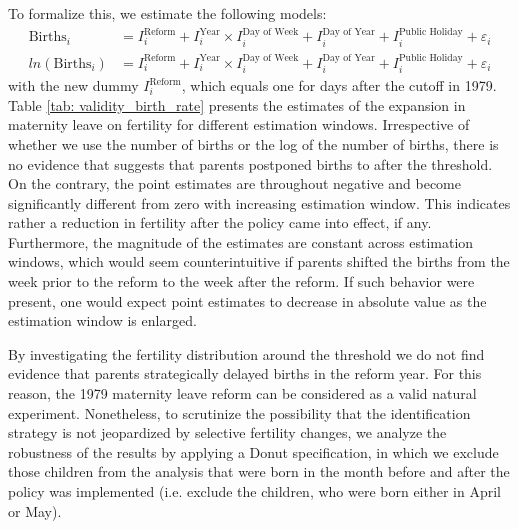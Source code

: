 \documentclass[11pt, a4paper]{article} %
\begin{document}
To formalize this, we estimate the following models: 
\begin{align}
\text{Births}_i &= I^{\text{Reform}}_i + I^{\text{Year}}_i\times I^{\text{Day of Week}}_i + I^{\text{Day of Year}}_i + I^{\text{Public Holiday}}_i + \varepsilon_i  \label{eq: validity_tab_birth} \\
ln(\text{Births}_i) &= I^{\text{Reform}}_i + I^{\text{Year}}_i\times I^{\text{Day of Week}}_i + I^{\text{Day of Year}}_i + I^{\text{Public Holiday}}_i + \varepsilon_i \label{eq: validity_tab_lnbirth}
\end{align}
with the new dummy $I^{\text{Reform}}_i$, which equals one for days after the cutoff in 1979. Table \ref{tab: validity_birth_rate} presents the estimates of the expansion in maternity leave on fertility for different estimation windows. Irrespective of whether we use the number of births or the log of the number of births, there is no evidence that suggests that parents postponed births to after the threshold. On the contrary, the point estimates are throughout negative and become significantly different from zero with increasing estimation window. This indicates rather a reduction in fertility after the policy came into effect, if any. Furthermore, the magnitude of the estimates are constant across estimation windows, which would seem counterintuitive if parents shifted the births from the week prior to the reform to the week after the reform. If such behavior were present, one would expect point estimates to decrease in absolute value as the estimation window is enlarged. \newline 

By investigating the fertility distribution around the threshold we do not find evidence that parents strategically delayed births in the reform year. For this reason, the 1979 maternity leave reform can be considered as a valid natural experiment. Nonetheless, to scrutinize the possibility that the identification strategy is not jeopardized by selective fertility changes, we analyze the robustness of the results by applying a Donut specification, in which we exclude those children from the analysis that were born in the month before and after the policy was implemented (i.e. exclude the children, who were born either in April or May).




	
\end{document}

